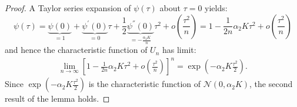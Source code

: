 {\begin{proof}
    A Taylor series expansion of $\psi(\tau)$ about $\tau = 0$ yields: $$\psi(\tau) = \underbrace{\psi(0)}_{=1} + \underbrace{\psi^{'}(0)}_{=0}\tau + \frac{1}{2} \underbrace{\psi^{''}(0)}_{= -\frac{\alpha_2 K}{n}}\tau^2 + o \left(\frac{\tau^2}{n}\right) = 1 - \frac{1}{2n}\alpha_2 K \tau^2 + o \left(\frac{\tau^2}{n}\right)$$
    and hence the characteristic function of $U_n$ has limit:
    \begin{gather}
        \lim_{n \rightarrow \infty} \left [ 1 - \frac{1}{2n}\alpha_2 K \tau^2 + o \left(\frac{\tau^2}{n}\right) \right]^n = \exp \left( -\alpha_2 K \frac{\tau^2}{2} \right).
    \end{gather}
    Since $\exp \left( -\alpha_2 K \frac{\tau^2}{2} \right)$ is the characteristic function of $\mathcal{N}(0,\alpha_2 K)$, the second result of the lemma holds.
    \end{proof}

}
